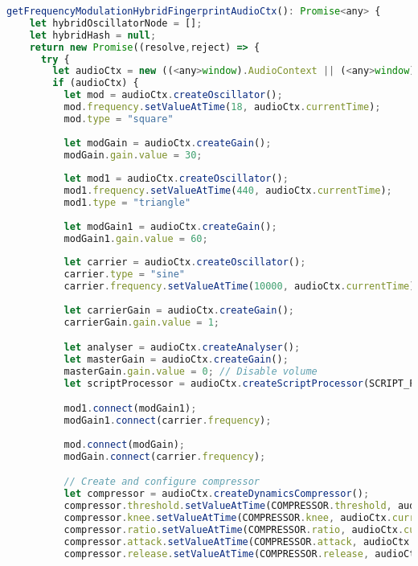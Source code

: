 \begin{lstlisting}[language=JavaScript, caption=Frequency Modulation Hybrid  fingerprint generation code, label=frequencyModualtionHybridFingerprintGenerationCode]
  getFrequencyModulationHybridFingerprintAudioCtx(): Promise<any> {
    let hybridOscillatorNode = [];
    let hybridHash = null;
    return new Promise((resolve,reject) => {
      try {
        let audioCtx = new ((<any>window).AudioContext || (<any>window).webkitAudioContext)();
        if (audioCtx) {
          let mod = audioCtx.createOscillator();
          mod.frequency.setValueAtTime(18, audioCtx.currentTime);
          mod.type = "square"
  
          let modGain = audioCtx.createGain();
          modGain.gain.value = 30;
  
          let mod1 = audioCtx.createOscillator();
          mod1.frequency.setValueAtTime(440, audioCtx.currentTime);
          mod1.type = "triangle"
      
          let modGain1 = audioCtx.createGain();
          modGain1.gain.value = 60;
  
          let carrier = audioCtx.createOscillator();
          carrier.type = "sine"
          carrier.frequency.setValueAtTime(10000, audioCtx.currentTime);
          
          let carrierGain = audioCtx.createGain();
          carrierGain.gain.value = 1;

          let analyser = audioCtx.createAnalyser();
          let masterGain = audioCtx.createGain();
          masterGain.gain.value = 0; // Disable volume
          let scriptProcessor = audioCtx.createScriptProcessor(SCRIPT_PROCESSOR.bufferSize, SCRIPT_PROCESSOR.numberOfInputChannels, SCRIPT_PROCESSOR.numberOfOutputChannels);

          mod1.connect(modGain1);
          modGain1.connect(carrier.frequency);
    
          mod.connect(modGain);
          modGain.connect(carrier.frequency);

          // Create and configure compressor
          let compressor = audioCtx.createDynamicsCompressor();
          compressor.threshold.setValueAtTime(COMPRESSOR.threshold, audioCtx.currentTime);
          compressor.knee.setValueAtTime(COMPRESSOR.knee, audioCtx.currentTime);
          compressor.ratio.setValueAtTime(COMPRESSOR.ratio, audioCtx.currentTime);
          compressor.attack.setValueAtTime(COMPRESSOR.attack, audioCtx.currentTime);
          compressor.release.setValueAtTime(COMPRESSOR.release, audioCtx.currentTime);


\end{lstlisting}
